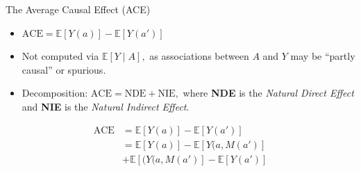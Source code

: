 \documentclass[12pt,t,handout]{beamer}
\newcommand{\E}{\mathbb{E}}
\begin{document}

\begin{frame}[c]{The Average Causal Effect (ACE)}

\begin{center}
\begin{itemize}
  \itemsep10pt
  \item $\text{ACE} = \E[Y(a)] - \E[Y(a')]$
  \item Not computed via $\E[Y \mid A],$ as associations between $A$ and $Y$ may
    be ``partly causal'' or spurious.
  \item Decomposition: $\text{ACE} = \text{NDE} + \text{NIE},$ where
    \textbf{NDE} is the \textit{Natural Direct Effect} and \textbf{NIE} is the
    \textit{Natural Indirect Effect}.
\end{itemize}
\begin{equation*}
\begin{split}
  \text{ACE} & = \E[Y(a)] - \E[Y(a')] \\ & = \E[Y(a)] - \E[Y(a, M(a')] \\ & +
    \E[(Y(a, M(a')] - \E[Y(a')]
\end{split}
\end{equation*}
\end{center}


\end{frame}

\end{document}
